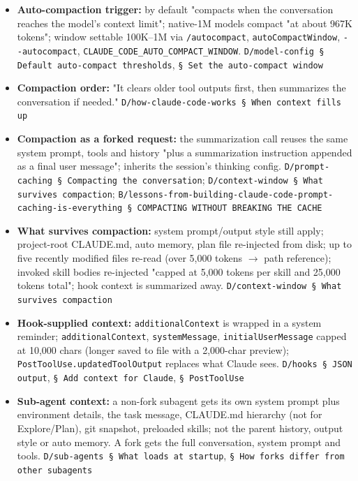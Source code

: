 \begin{itemize}
\item \textbf{Auto-compaction trigger:} by default "compacts when the conversation reaches the model's context limit"; native-1M models compact "at about 967K tokens"; window settable 100K--1M via \texttt{/\allowbreak{}autocompact}, \texttt{autoCompactWindow}, \texttt{-\allowbreak{}-\allowbreak{}autocompact}, \texttt{CLAUDE\_\allowbreak{}CODE\_\allowbreak{}AUTO\_\allowbreak{}COMPACT\_\allowbreak{}WINDOW}. \texttt{D/\allowbreak{}model-\allowbreak{}config § Default auto-\allowbreak{}compact thresholds}, \texttt{§ Set the auto-\allowbreak{}compact window}
\item \textbf{Compaction order:} "It clears older tool outputs first, then summarizes the conversation if needed." \texttt{D/\allowbreak{}how-\allowbreak{}claude-\allowbreak{}code-\allowbreak{}works § When context fills up}
\item \textbf{Compaction as a forked request:} the summarization call reuses the same system prompt, tools and history "plus a summarization instruction appended as a final user message"; inherits the session's thinking config. \texttt{D/\allowbreak{}prompt-\allowbreak{}caching § Compacting the conversation}; \texttt{D/\allowbreak{}context-\allowbreak{}window § What survives compaction}; \texttt{B/\allowbreak{}lessons-\allowbreak{}from-\allowbreak{}building-\allowbreak{}claude-\allowbreak{}code-\allowbreak{}prompt-\allowbreak{}caching-\allowbreak{}is-\allowbreak{}everything § COMPACTING WITHOUT BREAKING THE CACHE}
\item \textbf{What survives compaction:} system prompt/output style still apply; project-root CLAUDE.md, auto memory, plan file re-injected from disk; up to five recently modified files re-read (over 5,000 tokens $\rightarrow$ path reference); invoked skill bodies re-injected "capped at 5,000 tokens per skill and 25,000 tokens total"; hook context is summarized away. \texttt{D/\allowbreak{}context-\allowbreak{}window § What survives compaction}
\item \textbf{Hook-supplied context:} \texttt{additionalContext} is wrapped in a system reminder; \texttt{additionalContext}, \texttt{systemMessage}, \texttt{initialUserMessage} capped at 10,000 chars (longer saved to file with a 2,000-char preview); \texttt{PostToolUse.\allowbreak{}updatedToolOutput} replaces what Claude sees. \texttt{D/\allowbreak{}hooks § JSON output}, \texttt{§ Add context for Claude}, \texttt{§ PostToolUse}
\item \textbf{Sub-agent context:} a non-fork subagent gets its own system prompt plus environment details, the task message, CLAUDE.md hierarchy (not for Explore/Plan), git snapshot, preloaded skills; not the parent history, output style or auto memory. A fork gets the full conversation, system prompt and tools. \texttt{D/\allowbreak{}sub-\allowbreak{}agents § What loads at startup}, \texttt{§ How forks differ from other subagents}

\end{itemize}
